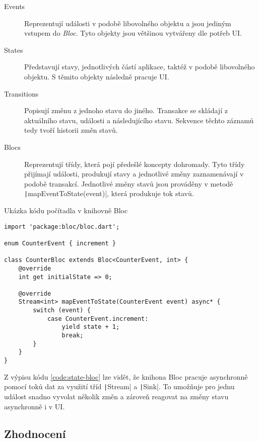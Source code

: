\begin{description}
    \item[Events] Reprezentují události v podobě libovolného objektu
    a jsou jediným vstupem do \emph{Bloc}.
    Tyto objekty jsou většinou vytvářeny dle potřeb UI.
    \item[States] Představují stavy,
    jednotlivých částí aplikace,
    taktéž v podobě libovolného objektu.
    S těmito objekty následně pracuje UI.
    \item[Transitions] Popisují změnu z jednoho stavu do jiného.
    Transakce se skládají z aktuálního stavu, události a následujícího stavu.
    Sekvence těchto záznamů tedy tvoří historii změn stavů.
    \item[Blocs] Reprezentují třídy,
    která pojí předešlé koncepty dohromady.
    Tyto třídy přijímají události, produkují stavy a jednotlivé změny
    zaznamenávají v podobě transakcí.
    Jednotlivé změny stavů jsou prováděny v metodě
    \texttt|mapEventToState(event)|,
    která produkuje tok stavů.
\end{description}

\begin{listing}
    \caption{Ukázka kódu počítadla v knihovně Bloc
    \cite{bloclibrary_coreconcepts}}
    \label{code:state-bloc}
    \begin{verbatim}
import 'package:bloc/bloc.dart';

enum CounterEvent { increment }

class CounterBloc extends Bloc<CounterEvent, int> {
    @override
    int get initialState => 0;

    @override
    Stream<int> mapEventToState(CounterEvent event) async* {
        switch (event) {
            case CounterEvent.increment:
                yield state + 1;
                break;
        }
    }
}
    \end{verbatim}
\end{listing}

Z výpisu kódu \ref{code:state-bloc} lze vidět,
že knihona Bloc pracuje asynchronně pomocí toků dat za využití
tříd \texttt|Stream| a \texttt|Sink|.
To umožňuje pro jednu událost snadno vyvolat několik změn
a zároveň reagovat na změny stavu asynchronně i v UI.

\subsection{Zhodnocení}

